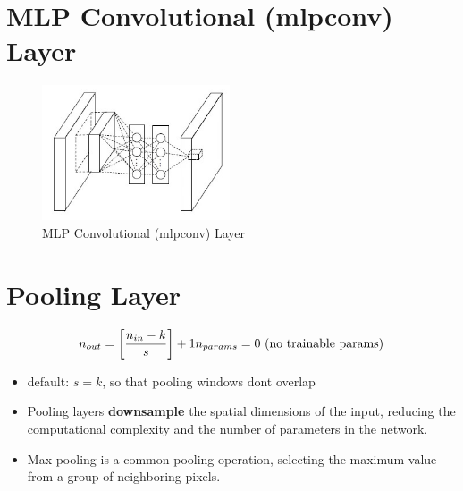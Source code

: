 
\section{MLP Convolutional (mlpconv) Layer \cite{medium/towardsdatascience.com/review-nin-network-in-network-image-classification-69e271e499ee}}

\begin{figure}[h]
    \centering
    \includegraphics[width=\linewidth, height=4cm, keepaspectratio]{Pictures/layers/conv-layer-mlp.jpg}
    \caption{MLP Convolutional (mlpconv) Layer}
\end{figure}




\section{Pooling Layer \cite{gfg-convolutional-neural-network-cnn-in-machine-learning}}\label{nn: Pooling Layer}

\[
   \displaystyle n_{out} = \left[ \dfrac{n_{in} - k}{s} \right] + 1
   \hfill
   n_{params} = 0 \text{ (no trainable params)}
\]

\begin{itemize}
    \item default: $s=k$, so that pooling windows dont overlap

    \item Pooling layers \textbf{downsample} the spatial dimensions of the input, reducing the computational complexity and the number of parameters in the network. 
    
    \item Max pooling is a common pooling operation, selecting the maximum value from a group of neighboring pixels.

\end{itemize}



